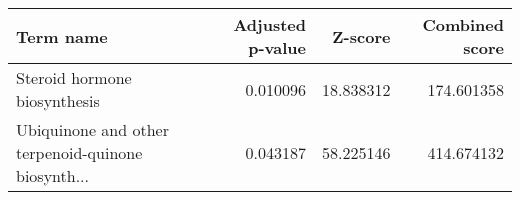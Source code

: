 \begin{tabular}{lrrr}
\toprule
                                         Term name &  Adjusted p-value &   Z-score &  Combined score \\
\midrule
                      Steroid hormone biosynthesis &          0.010096 & 18.838312 &      174.601358 \\
Ubiquinone and other terpenoid-quinone biosynth... &          0.043187 & 58.225146 &      414.674132 \\
\bottomrule
\end{tabular}
